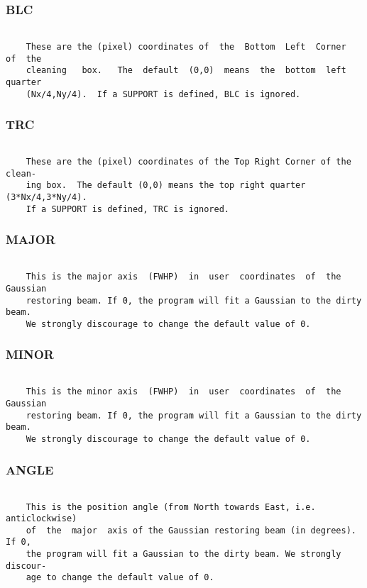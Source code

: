 \subsubsection{BLC}
\begin{verbatim}

    These are the (pixel) coordinates of  the  Bottom  Left  Corner  of  the
    cleaning   box.   The  default  (0,0)  means  the  bottom  left  quarter
    (Nx/4,Ny/4).  If a SUPPORT is defined, BLC is ignored.

\end{verbatim}
\subsubsection{TRC}
\begin{verbatim}

    These are the (pixel) coordinates of the Top Right Corner of the  clean-
    ing box.  The default (0,0) means the top right quarter (3*Nx/4,3*Ny/4).
    If a SUPPORT is defined, TRC is ignored.

\end{verbatim}
\subsubsection{MAJOR}
\begin{verbatim}

    This is the major axis  (FWHP)  in  user  coordinates  of  the  Gaussian
    restoring beam. If 0, the program will fit a Gaussian to the dirty beam.
    We strongly discourage to change the default value of 0.

\end{verbatim}
\subsubsection{MINOR}
\begin{verbatim}

    This is the minor axis  (FWHP)  in  user  coordinates  of  the  Gaussian
    restoring beam. If 0, the program will fit a Gaussian to the dirty beam.
    We strongly discourage to change the default value of 0.

\end{verbatim}
\subsubsection{ANGLE}
\begin{verbatim}

    This is the position angle (from North towards East, i.e. anticlockwise)
    of  the  major  axis of the Gaussian restoring beam (in degrees).  If 0,
    the program will fit a Gaussian to the dirty beam. We strongly  discour-
    age to change the default value of 0.

\end{verbatim}
